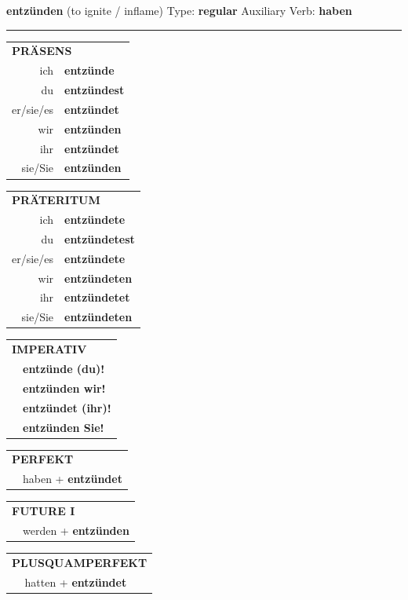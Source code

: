 \documentclass[10pt,a4paper]{revtex4-2}
\begin{document}
\begin{verbbox}
{\Large \bf entzünden} (to ignite / inflame) \hfill Type: \textbf{regular} \hfill Auxiliary Verb: \textbf{haben}

\vspace{5pt}
\hrule
\vspace{5pt}

\begin{tabular}{rl}
\multicolumn{2}{l}{\textbf{PRÄSENS}}\\
ich & \textbf{entzünde}\\
du & \textbf{entzündest}\\
er/sie/es & \textbf{entzündet}\\
wir & \textbf{entzünden}\\
ihr & \textbf{entzündet}\\
sie/Sie & \textbf{entzünden}\\
\end{tabular}
\hfill
\begin{tabular}{rl}
\multicolumn{2}{l}{\textbf{PRÄTERITUM}}\\
ich & \textbf{entzündete}\\
du & \textbf{entzündetest}\\
er/sie/es & \textbf{entzündete}\\
wir & \textbf{entzündeten}\\
ihr & \textbf{entzündetet}\\
sie/Sie & \textbf{entzündeten}\\
\end{tabular}
\hfill
\begin{tabular}{rl}
\multicolumn{2}{l}{\textbf{IMPERATIV}}\\
& \textbf{entzünde (du)!}\\
& \textbf{entzünden wir!}\\
& \textbf{entzündet (ihr)!}\\
& \textbf{entzünden Sie!}\\
\end{tabular}

\vspace{10pt}

\begin{tabular}{rl}
\multicolumn{2}{l}{\textbf{PERFEKT}}\\
& haben + \textbf{entzündet}\\
\end{tabular}
\hfill
\begin{tabular}{rl}
\multicolumn{2}{l}{\textbf{FUTURE I}}\\
& werden + \textbf{entzünden}\\
\end{tabular}
\hfill
\begin{tabular}{rl}
\multicolumn{2}{l}{\textbf{PLUSQUAMPERFEKT}}\\
& hatten + \textbf{entzündet}\\
\end{tabular}


\end{verbbox}
\end{document}
